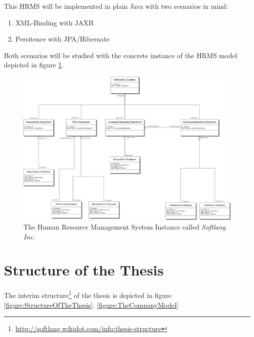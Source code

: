 \documentclass[runningheads,a4paper]{llncs}
\newcommand{\footnoteurl}[1]{\footnote{\url{#1}}}
\begin{document}
\noindent
This HRMS will be implemented in plain Java with two scenarios in mind:
\begin{enumerate}
\item 
XML-Binding with JAXB
\item
Persitence with JPA/Hibernate
\end{enumerate}
Both scenarios will be studied with the concrete instance of the HRMS model depicted in figure \ref{figure:TheCompanyInstanceCalledSoftlangInc}.

\begin{figure}[h!]
\centering
\includegraphics[width=.9\textwidth]{softlanginc.png}
\caption{The Human Resource Management System Instance called \textit{Softlang Inc.}}
\label{figure:TheCompanyInstanceCalledSoftlangInc}
\end{figure}

\section{Structure of the Thesis}
\label{section:StructureOfTheThesis}
The interim structure\footnoteurl{http://softlang.wikidot.com/info:thesis-structure} of the thesis is depicted in figure \ref{figure:StructureOfTheThesis}.
\ref{figure:TheCompanyModel}
\end{document}
